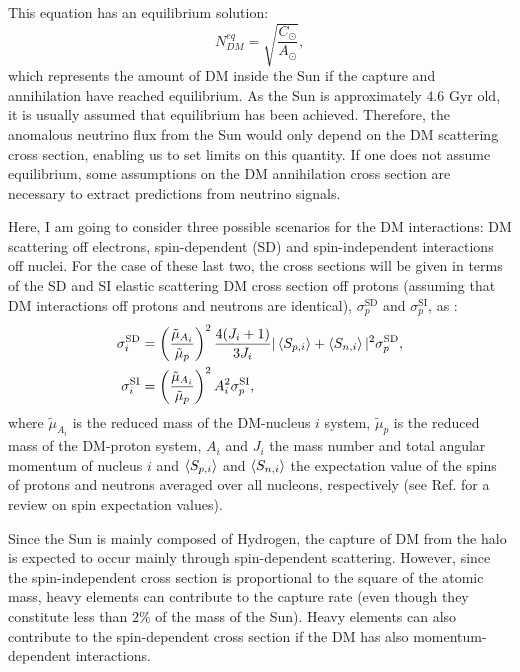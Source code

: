 This equation has an equilibrium solution:
\begin{equation}\label{2.2}
	N_{DM}^{eq} = \sqrt{\frac{C_{\odot}}{A_{\odot}}},
\end{equation}
which represents the amount of DM inside the Sun if the capture and annihilation have reached equilibrium. As the Sun is approximately $4.6$ Gyr old, it is usually assumed that equilibrium has been achieved. Therefore, the anomalous neutrino flux from the Sun would only depend on the DM scattering cross section, enabling us to set limits on this quantity. If one does not assume equilibrium, some assumptions on the DM annihilation cross section are necessary to extract predictions from neutrino signals.

Here, I am going to consider three possible scenarios for the DM interactions: DM scattering off electrons, spin-dependent (SD) and spin-independent interactions off nuclei. For the case of these last two, the cross sections will be given in terms of the SD and SI elastic scattering DM cross section off protons (assuming that DM interactions off protons and neutrons are identical), $\sigma_{p}^{\mathrm{SD}}$ and $\sigma_{p}^{\mathrm{SI}}$, as \cite{Bernal2012,Palomares2017}:
\begin{align}\label{2.3-2.4}
	\sigma_{i}^{\mathrm{SD}} &= \left(\frac{\tilde{\mu}_{A_{i}}}{\tilde{\mu}_{p}}\right)^{2} \frac{4(J_{i}+1)}{3 J_{i}} |\expval{S_{p,i}} + \expval{S_{n,i}}|^{2} \sigma_{p}^{\mathrm{SD}},\\
	\sigma_{i}^{\mathrm{SI}} &= \left(\frac{\tilde{\mu}_{A_{i}}}{\tilde{\mu}_{p}}\right)^{2} A_{i}^{2} \sigma_{p}^{\mathrm{SI}},
\end{align}
where $\tilde{\mu}_{A_{i}}$ is the reduced mass of the DM-nucleus $i$ system, $\tilde{\mu}_{p}$ is the reduced mass of the DM-proton system, $A_{i}$ and $J_{i}$ the mass number and total angular momentum of nucleus $i$ and $\expval{S_{p,i}}$ and $\expval{S_{n,i}}$ the expectation value of the spins of protons and neutrons averaged over all nucleons, respectively (see Ref. \cite{Bednyakov2004} for a review on spin expectation values).

Since the Sun is mainly composed of Hydrogen, the capture of DM from the halo is expected to occur mainly through spin-dependent scattering. However, since the spin-independent cross section is proportional to the square of the atomic mass, heavy elements can contribute to the capture rate (even though they constitute less than $2\%$ of the mass of the Sun). Heavy elements can also contribute to the spin-dependent cross section if the DM has also momentum-dependent interactions.

